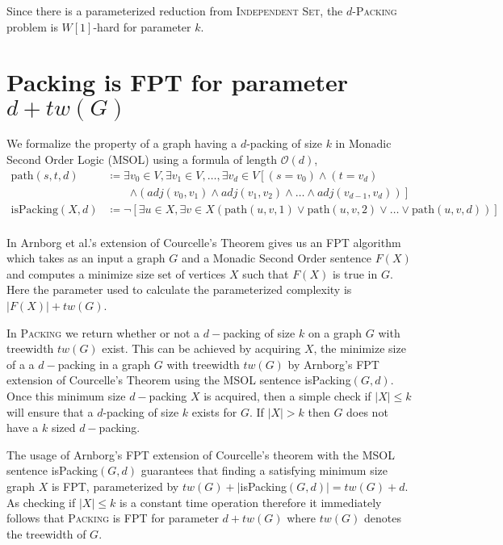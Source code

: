 \documentclass[10pt, a4paper]{article}
\theoremstyle{definition}
\newcommand{\mcO}{\mathcal{O}}
\begin{document}
Since there is a parameterized reduction from \textsc{Independent Set}, the $d$-\textsc{Packing} problem is $W[1]$-hard for parameter $k$. 

\section{\sc Packing \textnormal{is FPT for parameter $d + tw(G)$}}

We formalize the property of a graph having a $d$-packing of size $k$ in Monadic Second Order Logic (MSOL) using a formula of length $\mcO(d)$,
\begin{align*}
	\mathrm{path}(s, t, d) 		&\coloneqq \exists v_0 \in V, \exists v_1 \in V, \dotsc, \exists v_d \in V
									\left [ (s=v_0) \wedge (t=v_d) \right.\nonumber \\
								&\qquad \left. \wedge (adj(v_0, v_1) \wedge adj(v_1, v_2) 
									\wedge \dots \wedge adj(v_{d-1}, v_d)) \right ] \\
	\mathrm{isPacking}(X, d)	&\coloneqq \neg \left [\exists u \in X, \exists v \in X (\mathrm{path}(u, v, 1) 
									\vee \mathrm{path}(u, v, 2) \vee \dots \vee \mathrm{path}(u, v, d) ) \right ] \\
\end{align*}

In Arnborg et al.'s \cite{Arnborg1991} extension of Courcelle's Theorem gives us an FPT algorithm which takes as an input a graph $G$ and a Monadic Second Order sentence $F(X)$ and computes a minimize size set of vertices $X$ such that $F(X)$ is true in $G$. Here the parameter used to calculate the parameterized complexity is $|F(X)| + tw(G)$. 

In \textsc{Packing} we return whether or not a $d-$packing of size $k$ on a graph $G$ with treewidth $tw(G)$ exist. This can be achieved by acquiring $X$, the minimize size of a a $d-$packing in a graph $G$ with treewidth $tw(G)$ by Arnborg's FPT extension of Courcelle's Theorem using the MSOL sentence isPacking$(G,d)$. Once this minimum size $d-$packing $X$ is acquired, then a simple check if $|X| \leq k$ will ensure that a $d$-packing of size $k$ exists for $G$. If $|X| > k$ then $G$ does not have a $k$ sized $d-$packing.



The usage of Arnborg's FPT extension of Courcelle's theorem with the MSOL sentence isPacking$(G,d)$ guarantees that finding a satisfying minimum size graph $X$ is FPT, parameterized by $tw(G) + |$isPacking$(G,d)| = tw(G) + d$. As checking if $|X| \leq k$ is a constant time operation therefore it immediately follows that \textsc{Packing} is FPT for parameter $d+tw(G)$ where $tw(G)$ denotes the treewidth of $G$.




\end{document}
